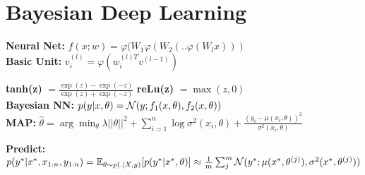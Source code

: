 \begin{comment}
	\pagebreak
\end{comment}

\section{Bayesian Deep Learning}
\begin{comment}
	We want to treat the weights of a neural network as distributions, for which we can define uncertainty as well.\\
\end{comment}

\textbf{Neural Net:} $f(x;w) = \varphi(W_1\varphi(W_2(..\varphi(W_l x)))$\\

\textbf{Basic Unit:} $v_i^{(l)} = \varphi(w_i^{(l)T} v^{(l-1)})$\\
\begin{comment}
	We want each unit to be differentiable, such that efficient computation graphs can be automatically created.\\
\end{comment}

\textbf{tanh(z)} $= \frac{\exp(z) - \exp(-z)}{\exp(z) + \exp(-z)}$
\textbf{reLu(z)} $= \max(z,0)$\\

\textbf{Bayesian NN:} $p(y | x,\theta) = \mathcal{N}(y; f_1(x, \theta), f_2(x, \theta))$\\

\textbf{MAP:} $\hat{\theta} = \arg\min_\theta \lambda ||\theta||^2 + \sum_{i=1}^n \log \sigma^2(x_i,\theta) + \frac{(y_i-\mu(x_i, \theta))^2}{\sigma^2(x_i, \theta)}$\\
\begin{comment}
	Can be derived by plugging in the Bayesian NN likelihood and a standard Gaussian prior.\\
	\textbf{Intuition:} The model can be far of the mean and can still balance it out with increased variance. High variance is costly, though.\\
	The model has to balance out how it explains the data with mean and variance.\\
\end{comment}

\textbf{Predict:} $p(y^* | x^*, x_{1:n}, y_{1:n}) 
= \mathbb{E}_{\theta \sim p(.|X,y)} [p(y^*|x^*,\theta)] \\
\approx \frac{1}{m} \sum_j^m \mathcal{N}(y^*; \mu(x^*, \theta^{(j)}), \sigma^2(x^*, \theta^{(j)}))$\\
\begin{comment}
	We just parameterize all the means and variances with our NN. If we use the reparameterization trick, we follow along an use $C\epsilon + \mu$ as new $\theta$.\\
	For Gaussian likelihood, the prediction becomes a mixture of Gaussians.\\
\end{comment}

